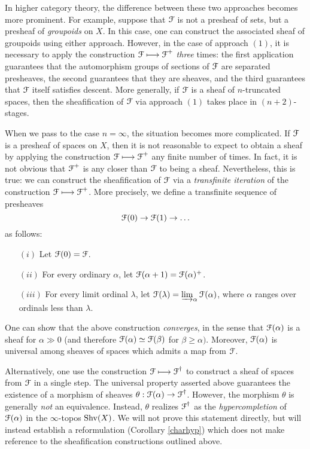 In higher category theory, the difference between these two approaches becomes more prominent. For example, suppose that $\operatorname{\mathcal{F}}$ is not a presheaf of sets, but a presheaf of {\em groupoids} on
$X$. In this case, one can construct the associated sheaf of groupoids using either approach. However, in the case of approach $(1)$, it is necessary to apply the construction
$\operatorname{\mathcal{F}} \longmapsto \operatorname{\mathcal{F}}^{+}$ {\em three} times: the first application guarantees that the automorphism groups of sections of $\operatorname{\mathcal{F}}$ are separated presheaves, the second guarantees that they are sheaves, and the third guarantees that $\operatorname{\mathcal{F}}$ itself satisfies descent. More generally, if $\operatorname{\mathcal{F}}$ is a sheaf of $n$-truncated spaces, then the sheafification of $\operatorname{\mathcal{F}}$ via approach $(1)$ takes place in $(n+2)$-stages. 

When we pass to the case $n= \infty$, the situation becomes more complicated. If $\operatorname{\mathcal{F}}$ is a presheaf of spaces on $X$, then it is not reasonable to expect to obtain a sheaf by applying the construction $\operatorname{\mathcal{F}} \longmapsto \operatorname{\mathcal{F}}^{+}$ any finite number of times. In fact, it is not obvious that $\operatorname{\mathcal{F}}^{+}$ is any closer than $\operatorname{\mathcal{F}}$ to being a sheaf. Nevertheless, this is true: we can construct the sheafification of $\operatorname{\mathcal{F}}$ via a {\em transfinite iteration} of the construction $\operatorname{\mathcal{F}} \longmapsto \operatorname{\mathcal{F}}^{+}$. More precisely, we define a transfinite sequence of presheaves
$$ \operatorname{\mathcal{F}}(0) \rightarrow \operatorname{\mathcal{F}}(1) \rightarrow \ldots $$
as follows:
\begin{itemize}
\item[$(i)$] Let $\operatorname{\mathcal{F}}(0) = \operatorname{\mathcal{F}}$.
\item[$(ii)$] For every ordinary $\alpha$, let $\operatorname{\mathcal{F}}(\alpha+1) = \operatorname{\mathcal{F}}(\alpha)^{+}$.
\item[$(iii)$] For every limit ordinal $\lambda$, let $\operatorname{\mathcal{F}}(\lambda) = \operatorname{\varinjlim}_{\alpha} \operatorname{\mathcal{F}}(\alpha)$, where $\alpha$ ranges over ordinals less than $\lambda$.
\end{itemize}

One can show that the above construction {\em converges}, in the sense that $\operatorname{\mathcal{F}}(\alpha)$
is a sheaf for $\alpha \gg 0$ (and therefore $\operatorname{\mathcal{F}}(\alpha) \simeq \operatorname{\mathcal{F}}(\beta)$ for $\beta \geq \alpha)$. Moreover, $\operatorname{\mathcal{F}}(\alpha)$ is universal among sheaves of spaces which admits a map from $\operatorname{\mathcal{F}}$.

Alternatively, one use the construction $\operatorname{\mathcal{F}} \longmapsto \operatorname{\mathcal{F}}^{\dagger}$ to construct a sheaf of spaces from $\operatorname{\mathcal{F}}$ in a single step. The universal property asserted above guarantees the existence of a morphism of sheaves $\theta: \operatorname{\mathcal{F}}(\alpha) \rightarrow \operatorname{\mathcal{F}}^{\dagger}$. However, the morphism $\theta$ is generally {\em not} an equivalence. Instead, $\theta$ realizes
$\operatorname{\mathcal{F}}^{\dagger}$ as the {\em hypercompletion} of $\operatorname{\mathcal{F}}(\alpha)$ in the $\infty$-topos $\operatorname{Shv}(X)$. 
We will not prove this statement directly, but will instead establish a reformulation (Corollary \ref{charhyp}) which does not make reference to the sheafification constructions outlined above.

